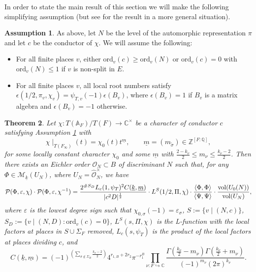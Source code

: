 \documentclass{amsart}
\newtheorem{theorem}{Theorem}[section]
\theoremstyle{definition}
\newtheorem{assumption}[theorem]{Assumption}
\theoremstyle{remark}
\numberwithin{equation}{section}
\newcommand{\ord}{\mathrm{ord}}
\newcommand{\Z}{{\mathbb Z}}
\newcommand{\A}{{\mathbb A}}
\newcommand{\Q}{{\mathbb Q}}
\newcommand{\C}{{\mathbb C}}
\newcommand{\cM}{{\mathcal M}}
\newcommand{\cP}{{\mathcal P}}
\newcommand{\cO}{{\mathcal O}}
\begin{document}
In order to state the main result of this section we will make the following simplifying assumption (but see \cite{preprintsanti2} for the result in a more general situation).
\begin{assumption}\label{Assonchi}
    As above, let $N$ be the level of the automorphic representation $\pi$ and let $c$ be the conductor of  $\chi$. We will assume the following:
    \begin{itemize}
        \item For all finite places $v$, either $\ord_v(c)\geq \ord_v(N)$ or $\ord_v(c)=0$ with $\ord_v(N)\leq 1$ if $v$ is non-split in $E$.
        
        \item  For all finite places $v$, all local root numbers satisfy $\epsilon(1/2,\pi_v,\chi_v)=\psi_{T,v}(-1)\epsilon(B_v)$, where $\epsilon(B_v)=1$ if $B_v$ is a matrix algebra and $\epsilon(B_v)=-1$ otherwise.
    \end{itemize}
\end{assumption}
\begin{theorem}\label{mainTHMintro}
Let $\chi:T(\A_F)/T(F)\rightarrow\C^\times$ be a character of conductor $c$ satisfying Assumption \ref{Assonchi} with  
\[
\chi\mid_{T(F_\infty)}(t)=\chi_0(t)t^{\underline m},\qquad \underline{m}=(m_{\tilde\sigma})\in \Z^{[F:\Q]},
\] 
for some locally constant character $\chi_0$ and some $\underline{m}$ with $\frac{2-k_{\nu}}{2}\leq m_{\nu}\leq\frac{k_{\nu}-2}{2}$.  Then there exists an  Eichler order $\cO_N\subset B$ of discriminant $N$
 such that, for any $\Phi\in \cM_{\underline k}(U_N)$, where $U_N=\hat\cO_N^\times$,
we have
\[
\cP(\Phi,\varepsilon,\chi)\cdot \cP(\Phi,\varepsilon,\chi^{-1})=\frac{2^{\#S_D}L_{c}(1,\psi_{T})^2
C(\underline k,\underline m)}{|c^2 D|^{\frac{1}{2}}}\cdot L^S(1/2,\Pi,\chi)\cdot\frac{\langle \Phi,\Phi\rangle}{\langle \Psi,\Psi\rangle}\cdot\frac{{\rm vol}(U_0(N))}{{\rm vol}(U_N)},
\]
where $\varepsilon$ is the lowest degree sign such that $\chi_{0,\sigma}(-1)=\varepsilon_\sigma$, $S:=\{v\mid (N,c)\}$, $S_D:=\{v\mid (N,D)\colon \ord_v(c)=0\}$, $L^S(s,\Pi,\chi)$ is the L-function with the local factors at places in $S\cup\Sigma_F$ removed, $L_{c}(s,\psi_{T})$ is the product of the local factors at places dividing $c$, and
    \[
    C(\underline k,\underline m)=(-1)^{\left(\sum_{\sigma\not\in\Sigma_B}\frac{k_{\sigma}-2}{2}\right)}4^{r_{1,B}+2r_2}\pi^{-r_1^B}\prod_{\nu:F\hookrightarrow\C}\frac{\Gamma(\frac{k_{\nu}}{2}-m_{\nu})\Gamma(\frac{k_{\nu}}{2}+m_{\nu})}{(-1)^{m_{\nu}}(2\pi)^{k_{\nu}}}.
    \]
\end{theorem}
\end{document}
